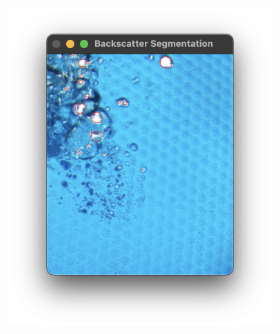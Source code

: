 \begin{figure}[H]
\begin{subfigure}{.6\textwidth}
\begin{subfigure}{0.32\textwidth}
            \includegraphics[width=1\linewidth]{assets/sys_segment.png}
            \caption{}
            \label{fig:sys_segment}
        \end{subfigure}
    \end{subfigure}
    \hfill
    \begin{subfigure}{.39\textwidth}
        \centering

\end{subfigure}
\end{figure}
